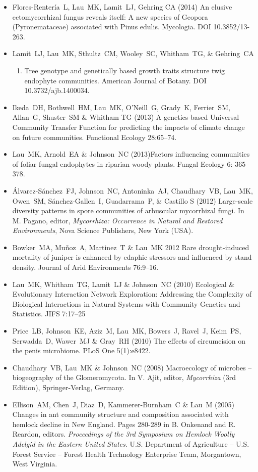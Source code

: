 \documentclass[]{article}
\begin{document}
\begin{itemize}
\item
  Flores-Rentería~L, Lau~MK, Lamit~LJ, Gehring CA (2014) An elusive
  ectomycorrhizal fungus reveals itself: A new species of Geopora
  (Pyronemataceae) associated with Pinus edulis. Mycologia. DOI
  10.3852/13-263.
\item
  Lamit~LJ, Lau~MK, Sthultz~CM, Wooley~SC, Whitham~TG, \& Gehring~CA

  \begin{enumerate}
  \def\labelenumi{(\arabic{enumi})}
  \setcounter{enumi}{2013}
  \itemsep1pt\parskip0pt
  \item
    Tree genotype and genetically based growth traits structure twig
    endophyte communities. American Journal of Botany. DOI
    10.3732/ajb.1400034.
  \end{enumerate}
\item
  Ikeda~DH, Bothwell~HM, Lau~MK, O'Neill~G, Grady~K, Ferrier~SM,
  Allan~G, Shuster~SM \& Whitham TG (2013) A genetics-based Universal
  Community Transfer Function for predicting the impacts of climate
  change on future communities. Functional Ecology 28:65--74.
\item
  Lau~MK, Arnold~EA \& Johnson~NC (2013)Factors influencing communities
  of foliar fungal endophytes in riparian woody plants. Fungal Ecology
  6: 365--378.
\item
  Álvarez-Sánchez~FJ, Johnson~NC, Antoninka~AJ, Chaudhary~VB, Lau~MK,
  Owen~SM, Sánchez-Gallen~I, Guadarrama~P, \& Castillo S (2012)
  Large-scale diversity patterns in spore communities of arbuscular
  mycorrhizal fungi. In M. Pagano, editor, \emph{Mycorrhiza: Occurrence
  in Natural and Restored Environments}, Nova Science Publishers, New
  York (USA).
\item
  Bowker~MA, Muñoz~A, Martinez~T \& Lau~MK 2012 Rare drought-induced
  mortality of juniper is enhanced by edaphic stressors and influenced
  by stand density. Journal of Arid Environments 76:9--16.
\item
  Lau~MK, Whitham~TG, Lamit~LJ \& Johnson~NC (2010) Ecological \&
  Evolutionary Interaction Network Exploration: Addressing the
  Complexity of Biological Interactions in Natural Systems with
  Community Genetics and Statistics. JIFS 7:17--25
\item
  Price~LB, Johnson~KE, Aziz~M, Lau~MK, Bowers~J, Ravel~J, Keim~PS,
  Serwadda~D, Wawer~MJ \& Gray~RH (2010) The effects of circumcision on
  the penis microbiome. PLoS One 5(1):e8422.
\item
  Chaudhary~VB, Lau~MK \& Johnson~NC (2008) Macroecology of microbes --
  biogeography of the Glomeromycota. In V. Ajit, editor,
  \emph{Mycorrhiza} (3rd Edition), Springer-Verlag, Germany.
\item
  Ellison~AM, Chen~J, Diaz~D, Kammerer-Burnham~C \& Lau~M (2005) Changes
  in ant community structure and composition associated with hemlock
  decline in New England. Pages 280-289 in B. Onkenand and R. Reardon,
  editors. \emph{Proceedings of the 3rd Symposium on Hemlock Woolly
  Adelgid in the Eastern United States}. U.S. Department of Agriculture
  -- U.S. Forest Service -- Forest Health Technology Enterprise Team,
  Morgantown, West Virginia.


\end{itemize}
\end{document}
